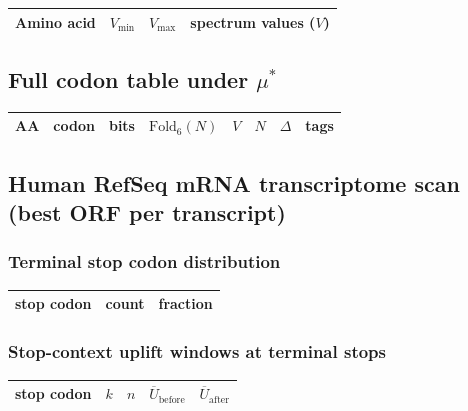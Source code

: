 \begin{center}
\small
\setlength{\tabcolsep}{6pt}
\renewcommand{\arraystretch}{1.15}
\begin{tabular}{lrrl}
\toprule
Amino acid & $V_{\min}$ & $V_{\max}$ & spectrum values ($V$) \\
\midrule

\end{tabular}
\end{center}

\subsection{Full codon table under \texorpdfstring{$\mu^\ast$}{mu*}}

\begin{center}
\scriptsize
\setlength{\tabcolsep}{4pt}
\renewcommand{\arraystretch}{1.05}
\begin{tabular}{llllrrrl}
\toprule
AA & codon & bits & $\mathrm{Fold}_6(N)$ & $V$ & $N$ & $\Delta$ & tags \\
\midrule

\end{tabular}
\end{center}

\subsection{Human RefSeq mRNA transcriptome scan (best ORF per transcript)}
\label{app:refseq_transcriptome}

\noindent

\subsubsection{Terminal stop codon distribution}
\begin{center}
\small
\setlength{\tabcolsep}{6pt}
\renewcommand{\arraystretch}{1.15}
\begin{tabular}{lrr}
\toprule
stop codon & count & fraction \\
\midrule

\end{tabular}
\end{center}

\subsubsection{Stop-context uplift windows at terminal stops}
\begin{center}
\small
\setlength{\tabcolsep}{6pt}
\renewcommand{\arraystretch}{1.15}
\begin{tabular}{lrrrr}
\toprule
stop codon & $k$ & $n$ & $\overline{U}_{\mathrm{before}}$ & $\overline{U}_{\mathrm{after}}$ \\
\midrule

\end{tabular}
\end{center}
\noindent

